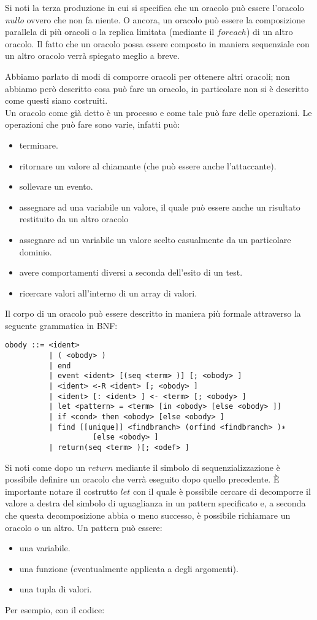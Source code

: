 \documentclass[a4paper,openright,twoside,12pt]{report}
\begin{document}
Si noti la terza produzione in cui si specifica che un oracolo pu\`o essere l'oracolo \emph{nullo} ovvero che non fa niente. O ancora, un oracolo pu\`o essere la composizione parallela di
pi\`u oracoli o la replica limitata (mediante il $foreach$) di un altro oracolo. Il fatto che un oracolo possa essere composto in maniera sequenziale con un altro oracolo
verr\`a spiegato meglio a breve.

Abbiamo parlato di modi di comporre oracoli per ottenere altri oracoli; non abbiamo per\`o descritto cosa pu\`o fare un oracolo, in particolare non si \`e 
descritto come questi siano costruiti.
\\Un oracolo come gi\`a detto \`e un processo e come tale pu\`o fare delle operazioni.
Le operazioni che pu\`o fare sono varie, infatti pu\`o:
\begin{itemize}
 \item terminare.
 \item ritornare un valore al chiamante (che pu\`o essere anche l'attaccante).
 \item sollevare un evento.
 \item assegnare ad una variabile un valore, il quale pu\`o essere anche un risultato restituito da un altro oracolo
 \item assegnare ad un variabile un valore scelto casualmente da un particolare dominio.
 \item avere comportamenti diversi a seconda dell'esito di un test.
 \item ricercare valori all'interno di un array di valori.
\end{itemize}
Il corpo di un oracolo pu\`o essere descritto in maniera pi\`u formale attraverso la seguente grammatica in BNF:
 

\begin{verbatim}
obody ::= <ident>
          | ( <obody> )
          | end
          | event <ident> [(seq <term> )] [; <obody> ]
          | <ident> <-R <ident> [; <obody> ]
          | <ident> [: <ident> ] <- <term> [; <obody> ]
          | let <pattern> = <term> [in <obody> [else <obody> ]]
          | if <cond> then <obody> [else <obody> ]
          | find [[unique]] <findbranch> (orfind <findbranch> )∗ 
                    [else <obody> ]
          | return(seq <term> )[; <odef> ]
\end{verbatim}
Si noti come dopo un $return$ mediante il simbolo di sequenzializzazione \`e possibile definire un oracolo che verr\`a eseguito dopo quello precedente.
\`E importante notare il costrutto $let$ con il quale \`e possibile cercare di decomporre il valore a destra del simbolo di uguaglianza in un pattern specificato e, 
a seconda che questa decomposizione abbia o meno successo, \`e possibile richiamare un oracolo o un altro. 
Un pattern pu\`o essere:
\begin{itemize}
 \item una variabile.
 \item una funzione (eventualmente applicata a degli argomenti).
 \item una tupla di valori. 
\end{itemize}
Per esempio, con il codice:
 
\end{document}
